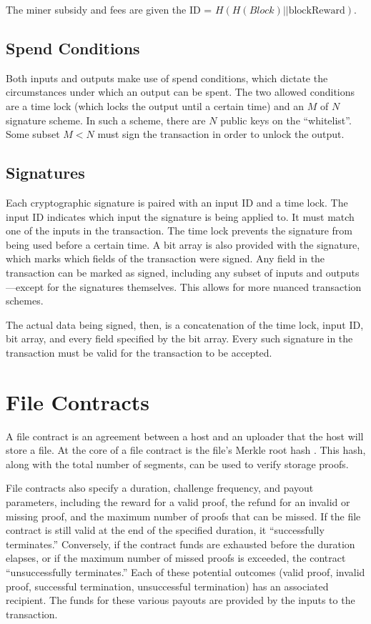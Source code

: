 \documentclass[twocolumn]{article}
\begin{document}
The miner subsidy and fees are given the ID = $H(H(Block) || \text{blockReward})$.

\subsection{Spend Conditions}
Both inputs and outputs make use of spend conditions, which dictate the circumstances under which an output can be spent.
The two allowed conditions are a time lock (which locks the output until a certain time) and an $M$ of $N$ signature scheme.
In such a scheme, there are $N$ public keys on the ``whitelist''.
Some subset $M < N$ must sign the transaction in order to unlock the output. 

\subsection{Signatures}
Each cryptographic signature is paired with an input ID and a time lock. 
The input ID indicates which input the signature is being applied to.
It must match one of the inputs in the transaction.
The time lock prevents the signature from being used before a certain time.
A bit array is also provided with the signature, which marks which fields of the transaction were signed.
Any field in the transaction can be marked as signed, including any subset of inputs and outputs---except for the signatures themselves.
This allows for more nuanced transaction schemes.

The actual data being signed, then, is a concatenation of the time lock, input ID, bit array, and every field specified by the bit array.
Every such signature in the transaction must be valid for the transaction to be accepted.

\section{File Contracts}
\label{sec:contracts}
A file contract is an agreement between a host and an uploader that the host will store a file.
At the core of a file contract is the file's Merkle root hash \cite{merkle}.
This hash, along with the total number of segments, can be used to verify storage proofs.

File contracts also specify a duration, challenge frequency, and payout parameters, including the reward for a valid proof, the refund for an invalid or missing proof, and the maximum number of proofs that can be missed.
If the file contract is still valid at the end of the specified duration, it ``successfully terminates.''
Conversely, if the contract funds are exhausted before the duration elapses, or if the maximum number of missed proofs is exceeded, the contract ``unsuccessfully terminates.''
Each of these potential outcomes (valid proof, invalid proof, successful termination, unsuccessful termination) has an associated recipient.
The funds for these various payouts are provided by the inputs to the transaction.
\end{document}
